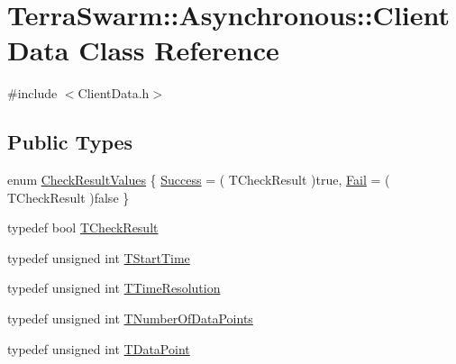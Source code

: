 \hypertarget{class_terra_swarm_1_1_asynchronous_1_1_client_data}{\section{Terra\-Swarm\-:\-:Asynchronous\-:\-:Client\-Data Class Reference}
\label{class_terra_swarm_1_1_asynchronous_1_1_client_data}
}


{\ttfamily \#include $<$Client\-Data.\-h$>$}

\subsection*{Public Types}
\begin{DoxyCompactItemize}
\item 
enum \hyperlink{class_terra_swarm_1_1_asynchronous_1_1_client_data_a4af3124197d375d54989d28c2703dc9f}{Check\-Result\-Values} \{ \hyperlink{class_terra_swarm_1_1_asynchronous_1_1_client_data_a4af3124197d375d54989d28c2703dc9fab47acf016a2a1f12737512d9ee7102a0}{Success} = ( T\-Check\-Result )true, 
\hyperlink{class_terra_swarm_1_1_asynchronous_1_1_client_data_a4af3124197d375d54989d28c2703dc9fa89702b1843b2d2547e4da97c3adca3d0}{Fail} = ( T\-Check\-Result )false
 \}
\item 
typedef bool \hyperlink{class_terra_swarm_1_1_asynchronous_1_1_client_data_a91575e9105c574792d5216d40f1c89de}{T\-Check\-Result}
\item 
typedef unsigned int \hyperlink{class_terra_swarm_1_1_asynchronous_1_1_client_data_a70b07646d3a13d9c2cb16ade44a49966}{T\-Start\-Time}
\item 
typedef unsigned int \hyperlink{class_terra_swarm_1_1_asynchronous_1_1_client_data_a626a7d114c405bceb24262253fe36c71}{T\-Time\-Resolution}
\item 
typedef unsigned int \hyperlink{class_terra_swarm_1_1_asynchronous_1_1_client_data_a690994afd0ba9b8eeb56ae679a5c64e8}{T\-Number\-Of\-Data\-Points}
\item 
typedef unsigned int \hyperlink{class_terra_swarm_1_1_asynchronous_1_1_client_data_ac733720fed15e940f991de44f1bb514e}{T\-Data\-Point}
\end{DoxyCompactItemize}
